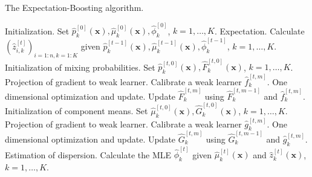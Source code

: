 \documentclass[11pt]{article}
\numberwithin{equation}{section}
\def\bx{\boldsymbol{x}}
\begin{document}
\begin{algorithm}[htp!]
	\caption{The Expectation-Boosting algorithm.} %
	\label{EB} %
	\begin{algorithmic}[1]
	\STATE Initialization. Set  $\hat{p}^{[0]}_k(\bx),\hat{\mu}^{[0]}_k(\bx),\hat{\phi}_k^{[0]}$, $k=1,\ldots,K$. 
	\STATE Expectation. Calculate $(\hat{z}^{[t]}_{i,k})_{i=1:n,k=1:K}$ given $\hat{p}^{[t-1]}_k(\bx),\hat{\mu}^{[t-1]}_k(\bx),\hat{\phi}^{[t-1]}_k$, $k=1,\ldots,K$. 
	\STATE Initialization of mixing probabilities. Set  $\hat{p}_k^{[t,0]}(\bx), \hat{F}_k^{[t,0]}(\bx)$, $k=1,\ldots, K$.
		\STATE Projection of gradient to weak learner. Calibrate a weak learner $\hat{f}_k^{[t,m]}$. 
		\STATE One dimensional optimization and update. Update $\hat{F}_k^{[t,m]}$ using $\hat{F}_k^{[t,m-1]}$ and $\hat{f}_k^{[t,m]}$.
		\ENDFOR
	   \ENDFOR
	\STATE Initialization of component means. Set  $\hat{\mu}_k^{[t,0]}(\bx), \hat{G}_k^{[t,0]}(\bx)$, $k=1,\ldots,K$. 
		\STATE Projection of gradient to weak learner. Calibrate a weak learner $\hat{g}_k^{[t,m]}$.
		\STATE One dimensional optimization and update.	Update $\hat{G}_k^{[t,m]}$ using $\hat{G}_k^{[t,m-1]}$ and $\hat{g}_k^{[t,m]}$.
		\ENDFOR
		\ENDFOR
	\STATE Estimation of dispersion. Calculate the MLE $\hat{\phi}^{[t]}_k$ given $\hat{\mu}^{[t]}_k(\bx)$ and $\hat{z}^{[t]}_k(\bx)$, $k=1,\ldots,K$.
	\ENDFOR
	\RETURN{$\hat{p}^{[T]}_k(\bx),\hat{\mu}^{[T]}_k(\bx),\hat{\phi}^{[T]}_k$, $k=1,\ldots,K$.}
	\end{algorithmic}
\end{algorithm}
\end{document}
